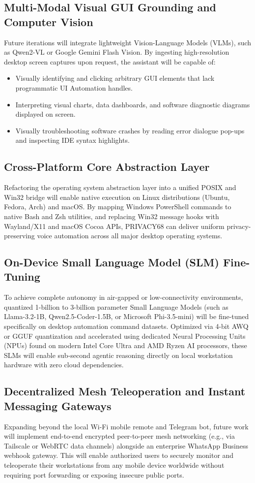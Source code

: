 \subsection{Multi-Modal Visual GUI Grounding and Computer Vision}
Future iterations will integrate lightweight Vision-Language Models (VLMs), such as Qwen2-VL or Google Gemini Flash Vision. By ingesting high-resolution desktop screen captures upon request, the assistant will be capable of:
\begin{itemize}
    \item Visually identifying and clicking arbitrary GUI elements that lack programmatic UI Automation handles.
    \item Interpreting visual charts, data dashboards, and software diagnostic diagrams displayed on screen.
    \item Visually troubleshooting software crashes by reading error dialogue pop-ups and inspecting IDE syntax highlights.
\end{itemize}

\subsection{Cross-Platform Core Abstraction Layer}
Refactoring the operating system abstraction layer into a unified POSIX and Win32 bridge will enable native execution on Linux distributions (Ubuntu, Fedora, Arch) and macOS. By mapping Windows PowerShell commands to native Bash and Zsh utilities, and replacing Win32 message hooks with Wayland/X11 and macOS Cocoa APIs, PRIVACY68 can deliver uniform privacy-preserving voice automation across all major desktop operating systems.

\subsection{On-Device Small Language Model (SLM) Fine-Tuning}
To achieve complete autonomy in air-gapped or low-connectivity environments, quantized 1-billion to 3-billion parameter Small Language Models (such as Llama-3.2-1B, Qwen2.5-Coder-1.5B, or Microsoft Phi-3.5-mini) will be fine-tuned specifically on desktop automation command datasets. Optimized via 4-bit AWQ or GGUF quantization and accelerated using dedicated Neural Processing Units (NPUs) found on modern Intel Core Ultra and AMD Ryzen AI processors, these SLMs will enable sub-second agentic reasoning directly on local workstation hardware with zero cloud dependencies.

\subsection{Decentralized Mesh Teleoperation and Instant Messaging Gateways}
Expanding beyond the local Wi-Fi mobile remote and Telegram bot, future work will implement end-to-end encrypted peer-to-peer mesh networking (e.g., via Tailscale or WebRTC data channels) alongside an enterprise WhatsApp Business webhook gateway. This will enable authorized users to securely monitor and teleoperate their workstations from any mobile device worldwide without requiring port forwarding or exposing insecure public ports.

